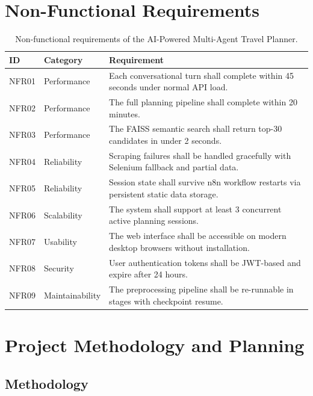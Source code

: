 \documentclass[12pt,a4paper]{report}
\begin{document}
\section{Non-Functional Requirements}
\begin{table}[H]
\centering
\small
\renewcommand{\arraystretch}{1.22}
\begin{tabularx}{\textwidth}{
    >{\centering\arraybackslash}p{1.2cm}
    >{\raggedright\arraybackslash}p{3.2cm}
    >{\raggedright\arraybackslash}X}
\toprule
\textbf{ID} & \textbf{Category} & \textbf{Requirement} \\
\midrule
NFR01 & Performance     & Each conversational turn shall complete within 45 seconds under normal API load. \\
NFR02 & Performance     & The full planning pipeline shall complete within 20 minutes. \\
NFR03 & Performance     & The FAISS semantic search shall return top-30 candidates in under 2 seconds. \\
NFR04 & Reliability     & Scraping failures shall be handled gracefully with Selenium fallback and partial data. \\
NFR05 & Reliability     & Session state shall survive n8n workflow restarts via persistent static data storage. \\
NFR06 & Scalability     & The system shall support at least 3 concurrent active planning sessions. \\
NFR07 & Usability       & The web interface shall be accessible on modern desktop browsers without installation. \\
NFR08 & Security        & User authentication tokens shall be JWT-based and expire after 24 hours. \\
NFR09 & Maintainability & The preprocessing pipeline shall be re-runnable in stages with checkpoint resume. \\
\bottomrule
\end{tabularx}
\caption{Non-functional requirements of the AI-Powered Multi-Agent Travel Planner.}
\label{tab:bnf}
\end{table}
\section{Project Methodology and Planning}

\subsection{Methodology}
\end{document}
